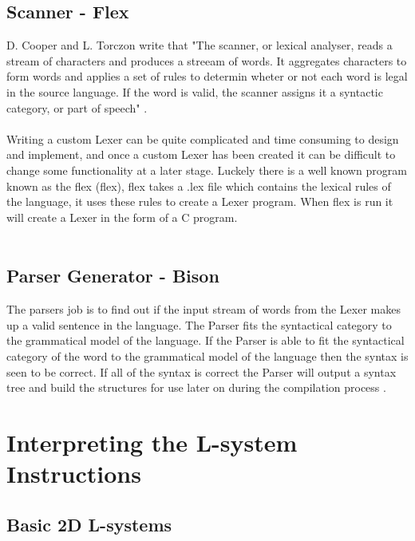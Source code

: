 \subsection{Scanner - Flex} \label{Flex}

D. Cooper and L. Torczon write that "The scanner, or lexical analyser, reads a stream of characters and produces a streeam of words. It aggregates characters to form words and applies a set of rules to determin wheter or not each word is legal in the source language. If the word is valid, the scanner assigns it a syntactic category, or part of speech" \cite{cooper2011engineering}. \\
\\ 
Writing a custom \gls{Lexer} can be quite complicated and time consuming to design and implement, and once a custom \gls{Lexer} has been created it can be difficult to change some functionality at a later stage. Luckely there is a well known program known as the \acrlong{flex} (\acrshort{flex}), \acrshort{flex} takes a .lex file which contains the lexical rules of the language, it uses these rules to create a \gls{Lexer} program. When \acrshort{flex} is run it will create a \gls{Lexer} in the form of a C program. \\
\\    


\subsection{Parser Generator - Bison} \label{Bison}

The parsers job is to find out if the input stream of words from the \gls{Lexer} makes up a valid sentence in the language. The \gls{Parser} fits the syntactical category to the grammatical model of the language. If the \gls{Parser} is able to fit the syntactical category of the word to the grammatical model of the language then the syntax is seen to be correct. If all of the syntax is correct the \gls{Parser} will output a syntax tree and build the structures for use later on during the compilation process \cite{cooper2011engineering}.


\section{Interpreting the L-system Instructions}

\subsection{Basic 2D L-systems} 

